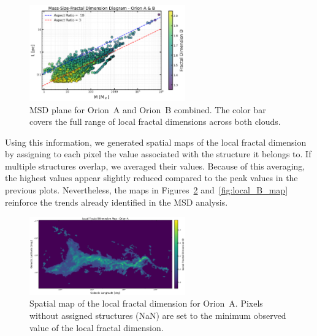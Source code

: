 \begin{figure}[t]
    \centering
    \includegraphics[width=0.6\textwidth]{figures/MSD_Orion_A_B.png}
    \caption{MSD plane for Orion~A and Orion~B combined. The color bar covers the full range of local fractal dimensions across both clouds.}
    \label{fig:MSD_orion_A_B}
\end{figure}

Using this information, we generated spatial maps of the local fractal dimension by assigning to each pixel the value associated with the structure it belongs to.  
If multiple structures overlap, we averaged their values.  
Because of this averaging, the highest values appear slightly reduced compared to the peak values in the previous plots.  
Nevertheless, the maps in Figures~\ref{fig:local_A_map} and~\ref{fig:local_B_map} reinforce the trends already identified in the MSD analysis.

\begin{figure}[t]
    \centering
    \includegraphics[width=0.6\textwidth]{figures/local_fractal_dimension_map_Orion_A.png}
    \caption{Spatial map of the local fractal dimension for Orion~A. Pixels without assigned structures (NaN) are set to the minimum observed value of the local fractal dimension.}
    \label{fig:local_A_map}
\end{figure}

